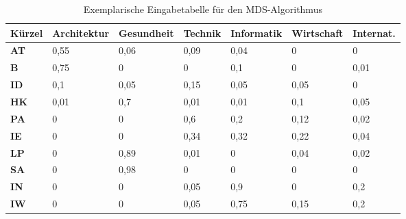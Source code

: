 \begin{table}[!ht]
    \centering
    \begin{tabular}{|l|l|l|l|l|l|l|}
    \hline
        \textbf{Kürzel} & \textbf{Architektur} & \textbf{Gesundheit} & \textbf{Technik} & \textbf{Informatik} & \textbf{Wirtschaft} & \textbf{Internat.} \\ \hline
        \textbf{AT} & 0,55 & 0,06 & 0,09 & 0,04 & 0 & 0 \\ \hline
        \textbf{B} & 0,75 & 0 & 0 & 0,1 & 0 & 0,01 \\ \hline
        \textbf{ID} & 0,1 & 0,05 & 0,15 & 0,05 & 0,05 & 0 \\ \hline
        \textbf{HK} & 0,01 & 0,7 & 0,01 & 0,01 & 0,1 & 0,05 \\ \hline
        \textbf{PA} & 0 & 0 & 0,6 & 0,2 & 0,12 & 0,02 \\ \hline
        \textbf{IE} & 0 & 0 & 0,34 & 0,32 & 0,22 & 0,04 \\ \hline
        \textbf{LP} & 0 & 0,89 & 0,01 & 0 & 0,04 & 0,02 \\ \hline
        \textbf{SA} & 0 & 0,98 & 0 & 0 & 0 & 0 \\ \hline
        \textbf{IN} & 0 & 0 & 0,05 & 0,9 & 0 & 0,2 \\ \hline
        \textbf{IW} & 0 & 0 & 0,05 & 0,75 & 0,15 & 0,2 \\ \hline
    \end{tabular}

    \caption{Exemplarische Eingabetabelle für den MDS-Algorithmus}
    \label{table:input-mds}
\end{table}

